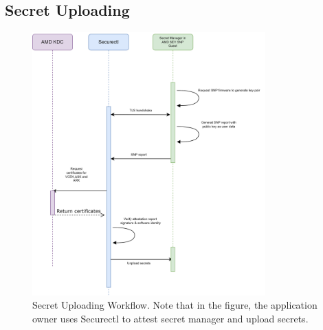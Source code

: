 \subsection{Secret Uploading}

\begin{figure}[H]
    \centering
    \includegraphics[width=0.8\textwidth]{images/upload_secret.png}
    \caption[Secret Uploading Workflow]{Secret Uploading Workflow. Note that in the figure, the application owner uses Securectl to attest secret manager and upload secrets.}
    \label{fig:upload_secret}
\end{figure}

